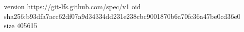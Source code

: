 version https://git-lfs.github.com/spec/v1
oid sha256:b93dfa7acc62df07a9d34334dd231e238cbc9001870b6a70fc36a47be0cd36e0
size 405615
